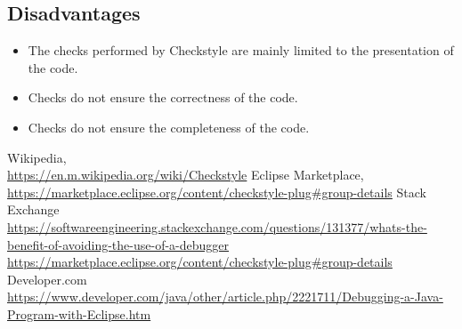 \documentclass[a4paper, 11pt]{article}
\begin{document}
 \subsection{Disadvantages}
 \begin{itemize}
  \item  The checks performed by Checkstyle are mainly limited to the presentation of the code.
  \item  Checks do not ensure the correctness of the code.
  \item  Checks do not ensure the completeness of the code.
\end{itemize}


\begin{thebibliography}{9}
Wikipedia,\\
\url{https://en.m.wikipedia.org/wiki/Checkstyle}
Eclipse Marketplace,\\
\url{https://marketplace.eclipse.org/content/checkstyle-plug#group-details}
Stack Exchange\\
\url{https://softwareengineering.stackexchange.com/questions/131377/whats-the-benefit-of-avoiding-the-use-of-a-debugger}
\url{https://marketplace.eclipse.org/content/checkstyle-plug#group-details}
Developer.com\\
\url{https://www.developer.com/java/other/article.php/2221711/Debugging-a-Java-Program-with-Eclipse.htm}
\end{thebibliography}
\end{document}
